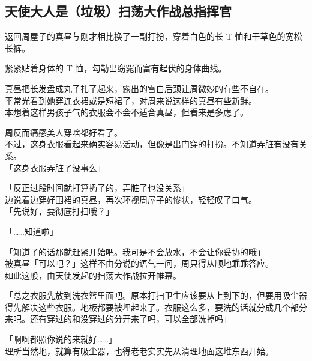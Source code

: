 \subsection{天使大人是（垃圾）扫荡大作战总指挥官}

返回周屋子的真昼与刚才相比换了一副打扮，穿着白色的长 T 恤和干草色的宽松长裤。

紧紧贴着身体的 T 恤，勾勒出窈窕而富有起伏的身体曲线。

真昼把长发盘成丸子扎了起来，露出的雪白后颈让周微妙的有些不自在。\\

平常光看到她穿连衣裙或是短裙了，对周来说这样的真昼有些新鲜。\\

本想着这样男孩子气的衣服会不会不适合真昼，但看来是多虑了。

周反而痛感美人穿啥都好看了。\\

不过，这身衣服看起来确实容易活动，但像是出门穿的打扮。不知道弄脏有没有关系。\\

「这身衣服弄脏了没事么」

「反正过段时间就打算扔了的，弄脏了也没关系」\\

边说着边穿好围裙的真昼，再次环视周屋子的惨状，轻轻叹了口气。\\

「先说好，要彻底打扫哦？」

「……知道啦」

「知道了的话那就赶紧开始吧。我可是不会放水，不会让你妥协的哦」\\

被真昼「可以吧？」这样不由分说的语气一问，周只得从顺地乖乖答应。\\

如此这般，由天使发起的扫荡大作战拉开帷幕。\\

\vspace{2\baselineskip}

「总之衣服先放到洗衣篮里面吧。原本打扫卫生应该要从上到下的，但要用吸尘器得先解决这些衣服。地板都要被埋起来了。衣服这么多，要洗的话就分成几个部分来吧。还有穿过的和没穿过的分开来了吗，可以全部洗掉吗」

「啊啊都照你说的来就好……」\\

理所当然地，就算有吸尘器，也得老老实实先从清理地面这堆东西开始。\\

